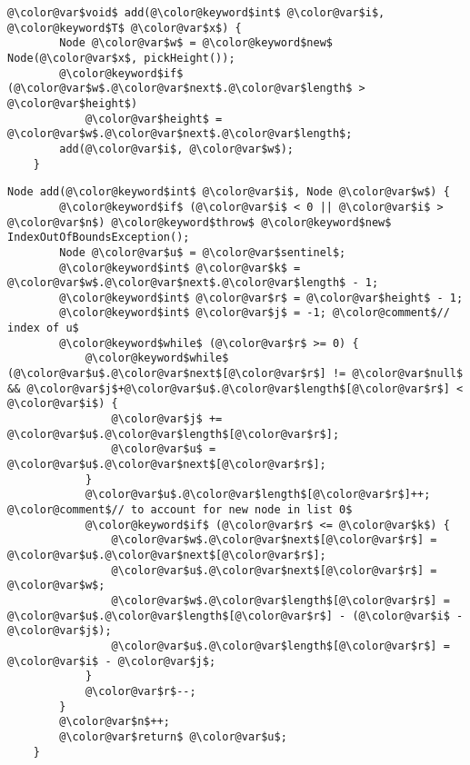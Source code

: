 \begin{Verbatim}[tabsize=2,frame=single,commandchars=\\@\$,label=\texttt{SkiplistList},labelposition=topline]
	@\color@var$void$ add(@\color@keyword$int$ @\color@var$i$, @\color@keyword$T$ @\color@var$x$) {
		Node @\color@var$w$ = @\color@keyword$new$ Node(@\color@var$x$, pickHeight());
		@\color@keyword$if$ (@\color@var$w$.@\color@var$next$.@\color@var$length$ > @\color@var$height$) 
			@\color@var$height$ = @\color@var$w$.@\color@var$next$.@\color@var$length$;
		add(@\color@var$i$, @\color@var$w$);
	}
\end{Verbatim}
\begin{Verbatim}[tabsize=2,frame=single,commandchars=\\@\$,label=\texttt{SkiplistList},labelposition=topline]
	Node add(@\color@keyword$int$ @\color@var$i$, Node @\color@var$w$) {
		@\color@keyword$if$ (@\color@var$i$ < 0 || @\color@var$i$ > @\color@var$n$) @\color@keyword$throw$ @\color@keyword$new$ IndexOutOfBoundsException();
		Node @\color@var$u$ = @\color@var$sentinel$;
		@\color@keyword$int$ @\color@var$k$ = @\color@var$w$.@\color@var$next$.@\color@var$length$ - 1;
		@\color@keyword$int$ @\color@var$r$ = @\color@var$height$ - 1;
		@\color@keyword$int$ @\color@var$j$ = -1; @\color@comment$// index of u$
		@\color@keyword$while$ (@\color@var$r$ >= 0) {
			@\color@keyword$while$ (@\color@var$u$.@\color@var$next$[@\color@var$r$] != @\color@var$null$ && @\color@var$j$+@\color@var$u$.@\color@var$length$[@\color@var$r$] < @\color@var$i$) {
				@\color@var$j$ += @\color@var$u$.@\color@var$length$[@\color@var$r$];
				@\color@var$u$ = @\color@var$u$.@\color@var$next$[@\color@var$r$];
			}
			@\color@var$u$.@\color@var$length$[@\color@var$r$]++;    @\color@comment$// to account for new node in list 0$
			@\color@keyword$if$ (@\color@var$r$ <= @\color@var$k$) {
				@\color@var$w$.@\color@var$next$[@\color@var$r$] = @\color@var$u$.@\color@var$next$[@\color@var$r$];
				@\color@var$u$.@\color@var$next$[@\color@var$r$] = @\color@var$w$;
				@\color@var$w$.@\color@var$length$[@\color@var$r$] = @\color@var$u$.@\color@var$length$[@\color@var$r$] - (@\color@var$i$ - @\color@var$j$);
				@\color@var$u$.@\color@var$length$[@\color@var$r$] = @\color@var$i$ - @\color@var$j$;
			}
			@\color@var$r$--;
		}
		@\color@var$n$++;
		@\color@var$return$ @\color@var$u$;
	}
\end{Verbatim}


